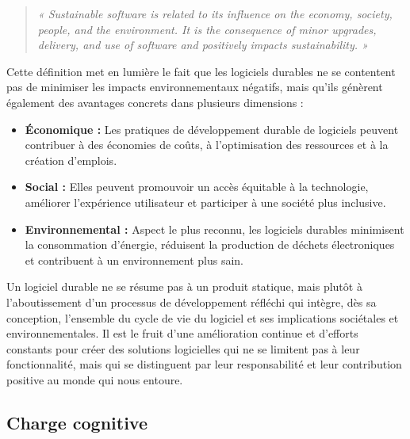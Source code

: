 \begin{quote}
    
    \emph{« Sustainable software is related to its influence on the economy, society, people, and the environment. It is the consequence of minor upgrades, delivery, and use of software and positively impacts sustainability. »}
    
\end{quote}


Cette définition met en lumière le fait que les logiciels durables ne se contentent pas de minimiser les impacts environnementaux négatifs, mais qu'ils génèrent également des avantages concrets dans plusieurs dimensions :

\begin{itemize}
    \item \textbf{Économique :} Les pratiques de développement durable de logiciels peuvent contribuer à des économies de coûts, à l'optimisation des ressources et à la création d'emplois.
    \item \textbf{Social :} Elles peuvent promouvoir un accès équitable à la technologie, améliorer l'expérience utilisateur et participer à une société plus inclusive.
    \item \textbf{Environnemental :} Aspect le plus reconnu, les logiciels durables minimisent la consommation d'énergie, réduisent la production de déchets électroniques et contribuent à un environnement plus sain.
\end{itemize}


Un logiciel durable ne se résume pas à un produit statique, mais plutôt à l'aboutissement d'un processus de développement réfléchi qui intègre, dès sa conception, l'ensemble du cycle de vie du logiciel et ses implications sociétales et environnementales. Il est le fruit d'une amélioration continue et d'efforts constants pour créer des solutions logicielles qui ne se limitent pas à leur fonctionnalité, mais qui se distinguent par leur responsabilité et leur contribution positive au monde qui nous entoure.


\subsection{Charge cognitive}

